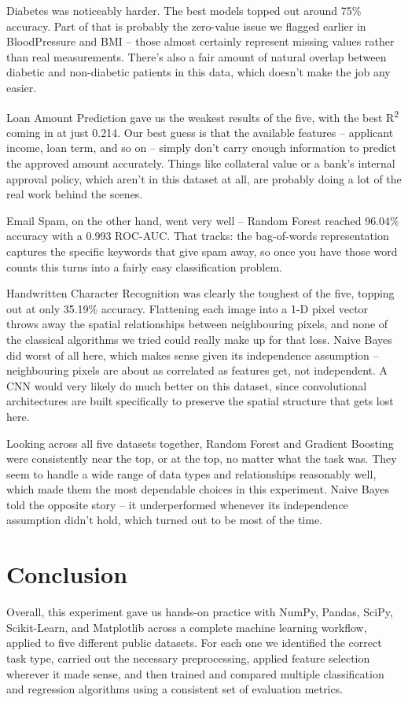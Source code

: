 \documentclass[12pt,a4paper]{article}
\begin{document}
Diabetes was noticeably harder. The best models topped out around 75\% accuracy. Part of that is probably the zero-value issue we flagged earlier in BloodPressure and BMI -- those almost certainly represent missing values rather than real measurements. There's also a fair amount of natural overlap between diabetic and non-diabetic patients in this data, which doesn't make the job any easier.
 
Loan Amount Prediction gave us the weakest results of the five, with the best R\textsuperscript{2} coming in at just 0.214. Our best guess is that the available features -- applicant income, loan term, and so on -- simply don't carry enough information to predict the approved amount accurately. Things like collateral value or a bank's internal approval policy, which aren't in this dataset at all, are probably doing a lot of the real work behind the scenes.
 
Email Spam, on the other hand, went very well -- Random Forest reached 96.04\% accuracy with a 0.993 ROC-AUC. That tracks: the bag-of-words representation captures the specific keywords that give spam away, so once you have those word counts this turns into a fairly easy classification problem.
 
Handwritten Character Recognition was clearly the toughest of the five, topping out at only 35.19\% accuracy. Flattening each image into a 1-D pixel vector throws away the spatial relationships between neighbouring pixels, and none of the classical algorithms we tried could really make up for that loss. Naive Bayes did worst of all here, which makes sense given its independence assumption -- neighbouring pixels are about as correlated as features get, not independent. A CNN would very likely do much better on this dataset, since convolutional architectures are built specifically to preserve the spatial structure that gets lost here.
 
Looking across all five datasets together, Random Forest and Gradient Boosting were consistently near the top, or at the top, no matter what the task was. They seem to handle a wide range of data types and relationships reasonably well, which made them the most dependable choices in this experiment. Naive Bayes told the opposite story -- it underperformed whenever its independence assumption didn't hold, which turned out to be most of the time.
 
\section{Conclusion}
Overall, this experiment gave us hands-on practice with NumPy, Pandas, SciPy, Scikit-Learn, and Matplotlib across a complete machine learning workflow, applied to five different public datasets. For each one we identified the correct task type, carried out the necessary preprocessing, applied feature selection wherever it made sense, and then trained and compared multiple classification and regression algorithms using a consistent set of evaluation metrics.
 
\end{document}
